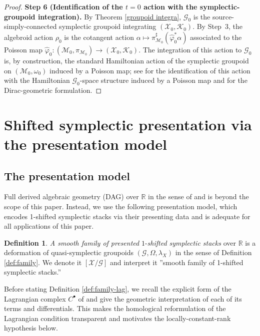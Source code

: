 \documentclass[reqno]{amsart}
\theoremstyle{plain}
\theoremstyle{definition}
\newtheorem{Def}[Thm]{Definition}
\newcommand{\R}{\mathbb{R}}
\newcommand{\G}{\mathcal{G}}
\newcommand{\M}{\mathcal{M}}
\newcommand{\X}{\mathcal{X}}
\newcommand{\K}{\mathcal{K}}
\begin{document}
\begin{proof}
\medskip
\noindent\textbf{Step 6 (Identification of the $t=0$ action with the symplectic-groupoid integration).}
By Theorem \ref{groupoid integra}, $\mathcal{G}_0$ is the
source-simply-connected symplectic groupoid integrating
$(\mathcal{X}_0, \mathcal{K}_0)$. By Step~3, the algebroid action $\rho_0$ is
the cotangent action
$\alpha \mapsto \pi_{\M_0}^{\sharp}(\hat\varphi_0^{*}\alpha)$ associated to
the Poisson map $\hat\varphi_0 \colon (\M_0, \pi_{\M_0}) \to (\X_0, \K_0)$.
The integration of this action to $\G_0$ is, by construction, the
standard Hamiltonian action of the symplectic groupoid on $(\M_0, \omega_0)$ induced by a Poisson map; see \cite{mikami1988moments,xu2004momentum} for the identification of this action with the Hamiltonian $\G_0$-space structure induced by a Poisson map and \cite[Section~5.1]{bualibanu2026reduction} for the Dirac-geometric formulation.
\end{proof}

 

\section{Shifted symplectic presentation via the presentation model} \label{Section 7}

\subsection{The presentation model} Full derived algebraic geometry (DAG) over $\R$ in the sense of \cite{calaque2021derived} and \cite{pantev2013shifted} is beyond the scope of this paper. Instead, we use the following presentation model, which encodes 1-shifted symplectic stacks via their presenting data and is adequate for all applications of this paper.

\begin{Def}
\textit{A smooth family of presented} $1$-\textit{shifted symplectic stacks} over $\R$ is a deformation of quasi-symplectic groupoids $(\G,\Omega,\lambda_X)$ in the sense of Definition \ref{def:family}. We denote it $[\X/\G]$ and interpret it ''smooth family of 1-shifted symplectic stacks.''
\end{Def}

Before stating Definition \ref{def:family-lag}, we recall the explicit form of the Lagrangian complex $C^{\bullet}$ of \cite[Theorem 5.6]{bualibanu2026reduction} and give the geometric interpretation of each of its terms and differentials. This makes the homological reformulation of the Lagrangian condition transparent and motivates the locally-constant-rank hypothesis below.
\end{document}
